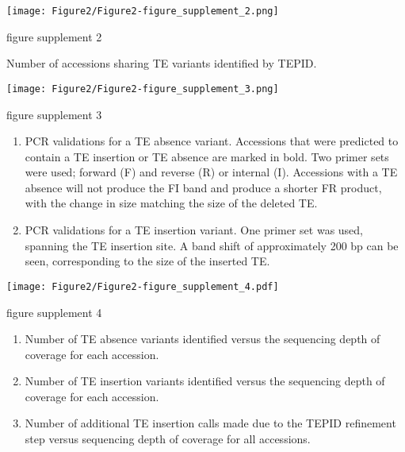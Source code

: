 \documentclass[12pt]{article}
\begin{document}
\pagebreak
\setcounter{suppfigure}{1}

\begin{suppfigure}
  \centering
  \texttt{[image: Figure2/Figure2-figure\_supplement\_2.png]}
  \caption{figure supplement 2}
  \label{fig2s2}
\end{suppfigure}

Number of accessions sharing TE variants identified by TEPID.

\pagebreak
\setcounter{suppfigure}{1}

\begin{suppfigure}
  \centering
  \texttt{[image: Figure2/Figure2-figure\_supplement\_3.png]}
  \caption{figure supplement 3}
  \label{fig2s3}
\end{suppfigure}

\begin{enumerate}
\def\labelenumi{(\Alph{enumi})}
\item
  PCR validations for a TE absence variant. Accessions that were
  predicted to contain a TE insertion or TE absence are marked in bold.
  Two primer sets were used; forward (F) and reverse (R) or internal
  (I). Accessions with a TE absence will not produce the FI band and
  produce a shorter FR product, with the change in size matching the
  size of the deleted TE.
\item
  PCR validations for a TE insertion variant. One primer set was used,
  spanning the TE insertion site. A band shift of approximately 200 bp
  can be seen, corresponding to the size of the inserted TE.
\end{enumerate}

\pagebreak

\setcounter{suppfigure}{1}

\begin{suppfigure}
  \centering
  \texttt{[image: Figure2/Figure2-figure\_supplement\_4.pdf]}
  \caption{figure supplement 4}
  \label{fig2s4}
\end{suppfigure}

\begin{enumerate}
\def\labelenumi{(\Alph{enumi})}
\item
  Number of TE absence variants identified versus the sequencing depth
  of coverage for each accession.
\item
  Number of TE insertion variants identified versus the sequencing depth
  of coverage for each accession.
\item
  Number of additional TE insertion calls made due to the TEPID
  refinement step versus sequencing depth of coverage for all
  accessions.
\end{enumerate}
\end{document}

